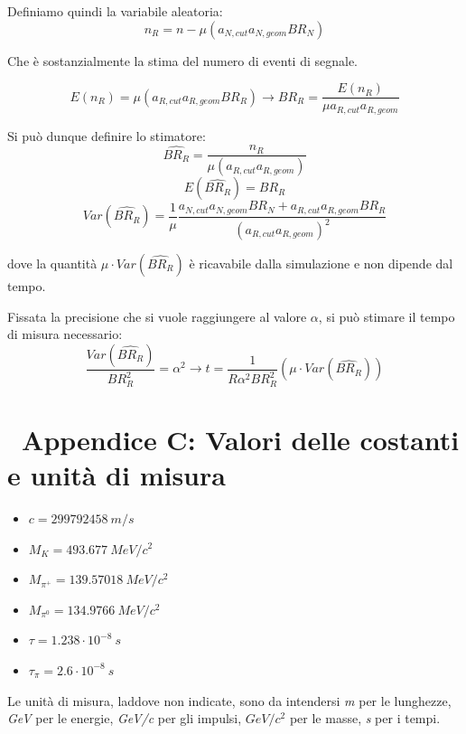 \documentclass[8pt]{extarticle}
\begin{document}
Definiamo quindi la variabile aleatoria:
$$
n_R = n - \mu (a_{N,cut}a_{N,geom}BR_N)
$$

Che è sostanzialmente la stima del numero di eventi di segnale. 

$$
E(n_R) = \mu (a_{R,cut}a_{R,geom}BR_R) \rightarrow BR_R = \frac{E(n_R)}{\mu a_{R,cut}a_{R,geom}}
$$

Si può dunque definire lo stimatore:
$$
\widehat{BR_R} = \frac{n_R}{\mu (a_{R,cut}a_{R,geom})}
$$
$$
E(\widehat{BR_R}) = BR_R
$$
$$
Var(\widehat{BR_R}) = \frac{1}{\mu} \frac{a_{N,cut}a_{N,geom}BR_N + a_{R,cut}a_{R,geom}BR_R}{(a_{R,cut}a_{R,geom})^2}
$$

dove la quantità $\mu \cdot Var(\widehat{BR_R})$ è ricavabile dalla simulazione e non dipende dal tempo.

Fissata la precisione che si vuole raggiungere al valore $\alpha$, si può stimare il tempo di misura necessario: 
$$
\frac{Var(\widehat{BR_R})}{BR_R^2} = \alpha^2 \rightarrow t = \frac{1}{R \alpha^2 BR_R^2} (\mu \cdot Var(\widehat{BR_R}))
$$

\section{\ Appendice C: Valori delle costanti e unità di misura}

\begin{itemize}
\item $c = 299792458\ m/s$
\item $M_K = 493.677\ MeV/c^2$
\item $M_{\pi^{+}} = 139.57018\ MeV/c^2$
\item $M_{\pi^0} = 134.9766\ MeV/c^2$
\item $\tau = 1.238\cdot 10^{-8}\ s$
\item $\tau_\pi = 2.6\cdot 10^{-8}\ s$
\end{itemize}

Le unità di misura, laddove non indicate, sono da intendersi \textit{m} per le lunghezze, \textit{GeV} per le energie, \textit{GeV/c} per gli impulsi, \textit{$GeV/c^2$} per le masse, \textit{s} per i tempi.

\newpage


\end{document}
